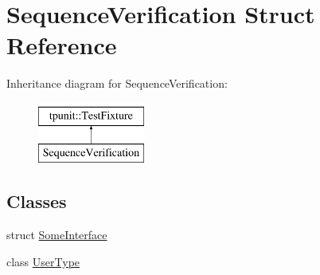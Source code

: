 \hypertarget{structSequenceVerification}{}\section{Sequence\+Verification Struct Reference}
\label{structSequenceVerification}
Inheritance diagram for Sequence\+Verification\+:\begin{figure}[H]
\begin{center}
\leavevmode
\includegraphics[height=2.000000cm]{structSequenceVerification}
\end{center}
\end{figure}
\subsection*{Classes}
\begin{DoxyCompactItemize}
\item 
struct \mbox{\hyperlink{structSequenceVerification_1_1SomeInterface}{Some\+Interface}}
\item 
class \mbox{\hyperlink{classSequenceVerification_1_1UserType}{User\+Type}}
\end{DoxyCompactItemize}
